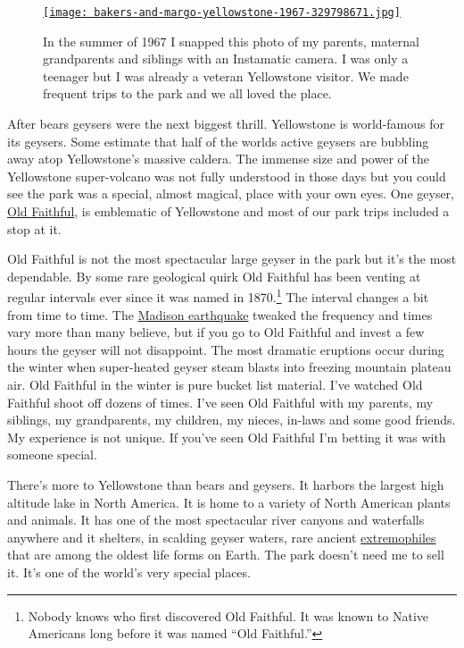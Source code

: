 \captionsetup[figure]{labelformat=empty}

\begin{SCfigure}
\centering
\href{http://conceptcontrol.smugmug.com/People/The-Way-We-Were/i-xCDHX8z/A}{\texttt{[image: bakers-and-margo-yellowstone-1967-329798671.jpg]}}
\caption[In 1967 I snapped this photo of my parents, maternal
grandparents and siblings in Yellowstone with an Instamatic camera.]{In the summer of 1967 I snapped this photo of my parents, maternal
grandparents and siblings with an Instamatic camera. I was only a
teenager but I was already a veteran Yellowstone visitor. We made
frequent trips to the park and we all loved the place.}
\label{fig:4186X1}
\end{SCfigure}

After bears geysers were the next biggest thrill. Yellowstone is
world-famous for its geysers. Some estimate that half of the worlds
active geysers are bubbling away atop Yellowstone's massive caldera. The
immense size and power of the Yellowstone super-volcano was not fully
understood in those days but you could see the park was a special,
almost magical, place with your own eyes. One geyser,
\href{http://www.nps.gov/yell/planyourvisit/noldfaith.htm}{Old
Faithful}, is emblematic of Yellowstone and most of our park trips
included a stop at it.

Old Faithful is not the most spectacular large geyser in the park but
it's the most dependable. By some rare geological quirk Old Faithful has
been venting at regular intervals ever since it was named in
1870.\footnote{
Nobody knows who first discovered Old Faithful. It was known to Native
Americans long before it was named ``Old Faithful.''
} The interval changes a bit from
time to time. The
\href{http://en.wikipedia.org/wiki/1959\_Yellowstone\_earthquake}{Madison
earthquake} tweaked the frequency and times vary more than many believe,
but if you go to Old Faithful and invest a few hours the geyser will not
disappoint. The most dramatic eruptions occur during the winter when
super-heated geyser steam blasts into freezing mountain plateau air. Old
Faithful in the winter is pure bucket list material. I've watched Old
Faithful shoot off dozens of times. I've seen Old Faithful with my
parents, my siblings, my grandparents, my children, my nieces, in-laws
and some good friends. My experience is not unique. If you've seen Old
Faithful I'm betting it was with someone special.

There's more to Yellowstone than bears and geysers. It harbors the
largest high altitude lake in North America. It is home to a variety of
North American plants and animals. It has one of the most spectacular
river canyons and waterfalls anywhere and it shelters, in scalding
geyser waters, rare ancient
\href{http://en.wikipedia.org/wiki/Extremophile}{extremophiles} that are
among the oldest life forms on Earth. The park doesn't need me to sell
it. It's one of the world's very special places.


